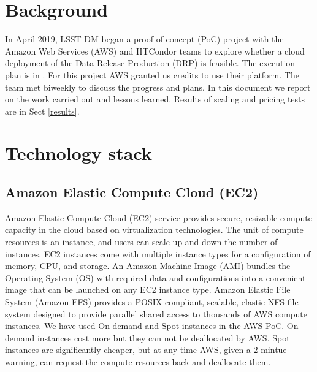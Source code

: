 \newcommand{\poc}{AWS PoC}





\section{Background}

In April 2019, LSST DM began a proof of concept (PoC) project with the Amazon Web Services (AWS) and HTCondor teams to explore whether a cloud deployment of the Data Release Production (DRP) is feasible.
The execution plan is in .
For this project AWS granted us credits to use their platform.
The team met biweekly to discuss the progress and plans.
In this document we report on the work carried out and lessons learned.
Results of scaling and pricing tests are in Sect \ref{results}.

\section{Technology stack}

\subsection{Amazon Elastic Compute Cloud (EC2)}

\href{https://aws.amazon.com/ec2/}{Amazon Elastic Compute Cloud (EC2)} service provides secure, resizable compute capacity in the cloud based on virtualization technologies.
The unit of compute resources is an instance, and users can scale up and down the number of instances.
EC2 instances come with multiple instance types for a configuration of memory, CPU, and storage.
An Amazon Machine Image (AMI) bundles the Operating System (OS) with required data and configurations into a convenient image that can be launched on any EC2 instance type.
\href{https://aws.amazon.com/efs/}{Amazon Elastic File System (Amazon EFS)} provides a POSIX-compliant, scalable, elastic NFS file system designed to provide parallel shared access to thousands of AWS compute instances.
We have used On-demand and Spot instances in the \poc.
On demand instances cost more but they can not be deallocated by AWS. Spot instances are significantly cheaper, but at any time AWS, given a 2 mintue warning, can request the compute resources back and deallocate them.
